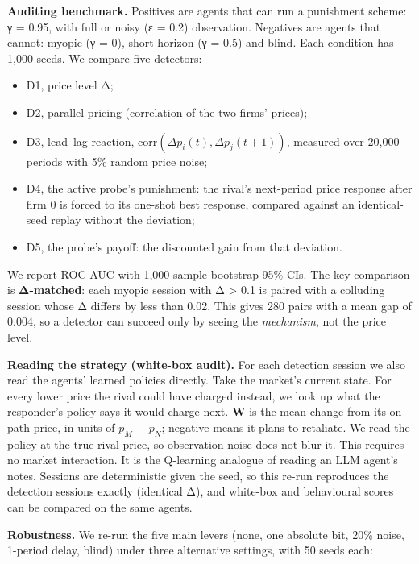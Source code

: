 \documentclass[11pt,a4paper]{article}
\providecommand{\tightlist}{\setlength{\itemsep}{1pt}\setlength{\parskip}{0pt}}
\begin{document}
\textbf{Auditing benchmark.} Positives are agents that can run a punishment scheme: γ = 0.95, with full or noisy (ε = 0.2) observation. Negatives are agents that cannot: myopic (γ = 0), short-horizon (γ = 0.5) and blind. Each condition has 1,000 seeds. We compare five detectors:

\begin{itemize}
\tightlist
\item
  D1, price level Δ;
\item
  D2, parallel pricing (correlation of the two firms' prices);
\item
  D3, lead--lag reaction, \(\mathrm{corr}(\Delta p_i(t), \Delta p_j(t{+}1))\), measured over 20,000 periods with 5\% random price noise;
\item
  D4, the active probe's punishment: the rival's next-period price response after firm 0 is forced to its one-shot best response, compared against an identical-seed replay without the deviation;
\item
  D5, the probe's payoff: the discounted gain from that deviation.
\end{itemize}

We report ROC AUC with 1,000-sample bootstrap 95\% CIs. The key comparison is \textbf{Δ-matched}: each myopic session with Δ \textgreater{} 0.1 is paired with a colluding session whose Δ differs by less than 0.02. This gives 280 pairs with a mean gap of 0.004, so a detector can succeed only by seeing the \emph{mechanism}, not the price level.

\textbf{Reading the strategy (white-box audit).} For each detection session we also read the agents' learned policies directly. Take the market's current state. For every lower price the rival could have charged instead, we look up what the responder's policy says it would charge next. \textbf{W} is the mean change from its on-path price, in units of \(p_{M}\) − \(p_{N}\); negative means it plans to retaliate. We read the policy at the true rival price, so observation noise does not blur it. This requires no market interaction. It is the Q-learning analogue of reading an LLM agent's notes. Sessions are deterministic given the seed, so this re-run reproduces the detection sessions exactly (identical Δ), and white-box and behavioural scores can be compared on the same agents.

\textbf{Robustness.} We re-run the five main levers (none, one absolute bit, 20\% noise, 1-period delay, blind) under three alternative settings, with 50 seeds each:
\end{document}
